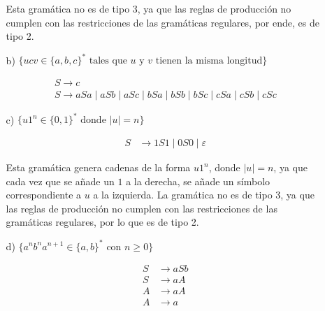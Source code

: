 \documentclass[12pt]{book} %
\begin{document}
\begin{ejercicio}
\begin{itemize}
\begin{itemize}
\begin{solucion}[media.a]
        Esta gramática no es de tipo 3, ya que las reglas de producción no cumplen con las restricciones de las gramáticas regulares, por ende, es de tipo 2.

        \end{solucion}

        \item[b)] $\{ucv \in \{a, b, c\}^* \text{ tales que } u \text{ y } v \text{ tienen la misma longitud}\}$
        
        \begin{solucion}[media.b]

        \begin{align*}
        S \rightarrow c \\
        S \rightarrow  aSa \mid aSb \mid aSc \mid bSa \mid bSb \mid bSc \mid cSa \mid cSb \mid cSc
        \end{align*}


        \end{solucion}

        \item[c)] $\{u1^n \in \{0, 1\}^* \text{ donde } |u| = n\}$
        

        \begin{solucion}[media.c]

        \begin{align*}
        S &\rightarrow 1S1 \mid 0S0 \mid \varepsilon
        \end{align*}

        Esta gramática genera cadenas de la forma $u1^n$, donde $|u| = n$, ya que cada vez que se añade un $1$ a la derecha, se añade un símbolo correspondiente a $u$ a la izquierda. La gramática no es de tipo 3, ya que las reglas de producción no cumplen con las restricciones de las gramáticas regulares, por lo que es de tipo 2.

        \end{solucion}

        
        \item[d)] $\{a^n b^n a^{n+1} \in \{a, b\}^* \text{ con } n \geq 0\}$


        \begin{solucion}[media.d]

        \begin{align*}
        S &\rightarrow aSb \\
        S &\rightarrow aA \\
        A &\rightarrow aA \\
        A &\rightarrow a
        \end{align*}


\end{solucion}
\end{itemize}
\end{itemize}
\end{ejercicio}
\end{document}
